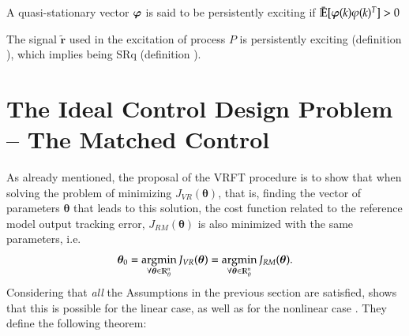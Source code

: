 \begin{defn} \label{def:PoE}
   A quasi-stationary vector $\bm{\varphi}$ is said to be persistently exciting if $\bar{\mathbb{E}}[\bm{\varphi}(k)\varphi(k)^{T}] > 0$
\end{defn}

\begin{assum}
   The signal $\tilde{\bm{r}}$ used in the excitation of process $P$ is persistently exciting (definition \label{def:PoE}), which implies being SRq (definition \label{def:SRq}).
\end{assum}



%

\section{The Ideal Control Design Problem -- The Matched Control}%
\label{sec:the_ideal_control_design_problem}

As already mentioned, the proposal of the VRFT procedure is to show that when solving the problem of minimizing $J_{VR}(\bm{\theta})$, that is, finding the vector of parameters $\bm{\theta}$ that leads to this solution, the cost function related to the reference model output tracking error, $J_{RM}(\bm{\theta})$ is also minimized with the same parameters, i.e.
\begin{equation}
   \bm{\theta}_0 = \operatorname*{argmin}_{\forall \bm{\theta} \in \mathbb{R}^n_\theta} J_{VR}(\bm{\theta}) = \operatorname*{argmin}_{\forall \bm{\theta} \in \mathbb{R}^n_\theta} J_{RM}(\bm{\theta}).
\label{eq:theta_JVR_JRM}
\end{equation}
Considering that \textit{all} the Assumptions in the previous section are satisfied, \cite{campi2002} shows that this is possible for the linear case, as well as for the nonlinear case \citep{campi2006}. They define the following theorem:

